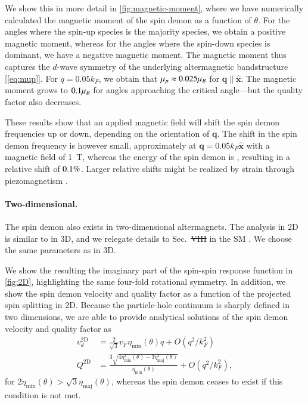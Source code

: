 \documentclass[aps,prl,reprint,twocolumns,superscriptaddress]{revtex4-2}
\newcommand{\xx}{\hat{\bm{x}}}
\newcommand{\kF}{k_{F}}
\newcommand{\vs}{v_d}
\providecommand{\DIFaddtex}[1]{{\protect\color{blue}\uwave{#1}}} %
\providecommand{\DIFdeltex}[1]{{\protect\color{red}\sout{#1}}}                      %
\providecommand{\DIFaddbegin}{} %
\providecommand{\DIFaddend}{} %
\providecommand{\DIFdelbegin}{} %
\providecommand{\DIFdelend}{} %
\providecommand{\DIFadd}[1]{\texorpdfstring{\DIFaddtex{#1}}{#1}} %
\providecommand{\DIFdel}[1]{\texorpdfstring{\DIFdeltex{#1}}{}} %
\begin{document}
	We show this in more detail in \cref{fig:magnetic-moment}, where we have numerically calculated the magnetic moment of the spin demon as a function of $\theta$. For the angles where the spin-up species is the majority species, we obtain a positive magnetic moment, whereas for the angles where the spin-down species is dominant, we have a negative magnetic moment. The magnetic moment thus captures the $d$-wave symmetry of the underlying altermagnetic bandstructure [\cref{eq:mup}]. For $q=0.05\kF$, we obtain that $\mu_p\approx0.025\mu_B$ for $\bm q\parallel \xx$. The magnetic moment grows to $0.1\mu_B$ for angles approaching the critical angle---but the quality factor also decreases. 

	These results show that an applied magnetic field will shift the spin demon frequencies up or down, depending on the orientation of $\bm q$. The shift in the spin demon frequency is however small, approximately \muBShift at $\bm q=0.05k_F\hat{\bm x}$ with a magnetic field of \SI{1}{T}, whereas the energy of the spin demon is \demonenergy, resulting in a relative shift of $0.1\%$. Larger relative shifts might be realized by strain through piezomagnetism \cite{aoyamaPiezomagneticPropertiesAltermagnetic2024}.

	
	
	
	\paragraph{Two-dimensional.}
	The spin demon also exists in two-dimensional altermagnets. The analysis in 2D is similar to in 3D, and we relegate details to Sec.~\DIFdelbegin \DIFdel{VIII }\DIFdelend \DIFaddbegin \DIFadd{IX }\DIFaddend in the SM \cite{Note1}. We choose the same parameters as in 3D.

	We show the resulting the imaginary part of the spin-spin response function in \cref{fig:2D}, highlighting the same four-fold rotational symmetry. 
	In addition, we show the spin demon velocity and quality factor as a function of the projected spin splitting in 2D. Because the particle-hole continuum is sharply defined in two dimensions,  we are able to provide analytical solutions of the spin demon velocity and quality factor as \cite{agarwalLonglivedSpinPlasmons2014}
	\begin{align}
		\vs^{\mathrm{2D}} &= \frac{2}{\sqrt{3}} v_F \eta_{\mathrm{min}}(\theta) q + O(q^2/\kF^2)\\
		Q^{\mathrm{2D}} &= \frac{3\sqrt{4\eta_{\mathrm{min}}^2(\theta)-3\eta_{\mathrm{maj}}^2(\theta)}}{\eta_{\mathrm{min}}(\theta)} + O(q^2/\kF^2),
	\end{align}
	for $2\eta_{\mathrm{min}}(\theta)>\sqrt{3}\eta_{\mathrm{maj}}(\theta)$, whereas the spin demon ceases to exist if this condition is not met. 
\end{document}
